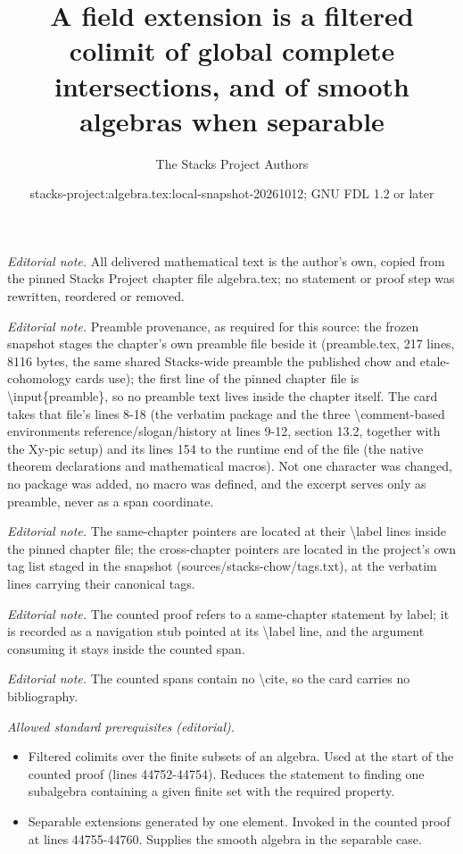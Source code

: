 \documentclass[10pt,a4paper]{amsart}
\title{A field extension is a filtered colimit of global complete intersections, and of smooth algebras when separable}
\author{The Stacks Project Authors}
\date{stacks-project:algebra.tex:local-snapshot-20261012; GNU FDL 1.2 or later}
\theoremstyle{plain}
\theoremstyle{definition}
\theoremstyle{remark}
\numberwithin{equation}{subsection}
\begin{document}
\maketitle
\noindent\textit{Editorial note.} All delivered mathematical text is the author's own, copied from the pinned Stacks Project chapter file algebra.tex; no statement or proof step was rewritten, reordered or removed.\par\medskip
\noindent\textit{Editorial note.} Preamble provenance, as required for this source: the frozen snapshot stages the chapter's own preamble file beside it (preamble.tex, 217 lines, 8116 bytes, the same shared Stacks-wide preamble the published chow and etale-cohomology cards use); the first line of the pinned chapter file is \textbackslash{}input\{preamble\}, so no preamble text lives inside the chapter itself. The card takes that file's lines 8-18 (the verbatim package and the three \textbackslash{}comment-based environments reference/slogan/history at lines 9-12, section 13.2, together with the Xy-pic setup) and its lines 154 to the runtime end of the file (the native theorem declarations and mathematical macros). Not one character was changed, no package was added, no macro was defined, and the excerpt serves only as preamble, never as a span coordinate.\par\medskip
\noindent\textit{Editorial note.} The same-chapter pointers are located at their \textbackslash{}label lines inside the pinned chapter file; the cross-chapter pointers are located in the project's own tag list staged in the snapshot (sources/stacks-chow/tags.txt), at the verbatim lines carrying their canonical tags.\par\medskip
\noindent\textit{Editorial note.} The counted proof refers to a same-chapter statement by label; it is recorded as a navigation stub pointed at its \textbackslash{}label line, and the argument consuming it stays inside the counted span.\par\medskip
\noindent\textit{Editorial note.} The counted spans contain no \textbackslash{}cite, so the card carries no bibliography.\par\medskip
\noindent\textit{Allowed standard prerequisites (editorial).}\begin{itemize}
\item Filtered colimits over the finite subsets of an algebra. Used at the start of the counted proof (lines 44752-44754). Reduces the statement to finding one subalgebra containing a given finite set with the required property.
\item Separable extensions generated by one element. Invoked in the counted proof at lines 44755-44760. Supplies the smooth algebra in the separable case.
\end{itemize}\medskip
\end{document}

